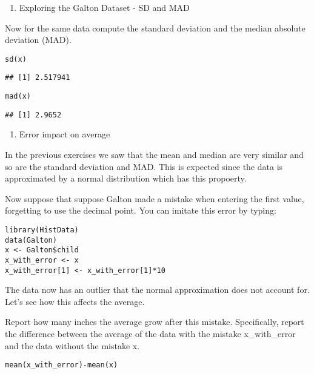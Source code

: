 \documentclass[]{article}
\providecommand{\tightlist}{%
  \setlength{\itemsep}{0pt}\setlength{\parskip}{0pt}}
\begin{document}
\begin{enumerate}
\def\labelenumi{\arabic{enumi}.}
\setcounter{enumi}{1}
\tightlist
\item
  Exploring the Galton Dataset - SD and MAD
\end{enumerate}

Now for the same data compute the standard deviation and the median
absolute deviation (MAD).

\begin{verbatim}
sd(x)
\end{verbatim}

\begin{verbatim}
## [1] 2.517941
\end{verbatim}

\begin{verbatim}
mad(x)
\end{verbatim}

\begin{verbatim}
## [1] 2.9652
\end{verbatim}

\begin{enumerate}
\def\labelenumi{\arabic{enumi}.}
\setcounter{enumi}{2}
\tightlist
\item
  Error impact on average
\end{enumerate}

In the previous exercises we saw that the mean and median are very
similar and so are the standard deviation and MAD. This is expected
since the data is approximated by a normal distribution which has this
propoerty.

Now suppose that suppose Galton made a mistake when entering the first
value, forgetting to use the decimal point. You can imitate this error
by typing:

\begin{verbatim}
library(HistData)
data(Galton)
x <- Galton$child
x_with_error <- x
x_with_error[1] <- x_with_error[1]*10
\end{verbatim}

The data now has an outlier that the normal approximation does not
account for. Let's see how this affects the average.

Report how many inches the average grow after this mistake.
Specifically, report the difference between the average of the data with
the mistake x\_with\_error and the data without the mistake x.

\begin{verbatim}
mean(x_with_error)-mean(x)
\end{verbatim}
\end{document}
